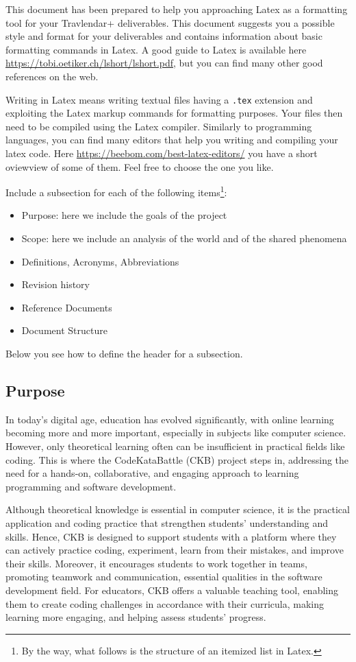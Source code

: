 This document has been prepared to help you approaching Latex as a formatting tool for your Travlendar+ deliverables. This document suggests you a possible style and format for your deliverables and contains information about basic formatting commands in Latex. A good guide to Latex is available here \href{https://tobi.oetiker.ch/lshort/lshort.pdf}{https://tobi.oetiker.ch/lshort/lshort.pdf}, but you can find many other good references on the web. 

Writing in Latex means writing textual files having a \texttt{.tex} extension and exploiting the Latex markup commands for formatting purposes. Your files then need to be compiled using the Latex compiler. Similarly to programming languages, you can find many editors that help you writing and compiling your latex code. Here \href{https://beebom.com/best-latex-editors/}{https://beebom.com/best-latex-editors/} you have a short oviewview of some of them. Feel free to choose the one you like.  

Include a subsection for each of the following items\footnote{By the way, what follows is the structure of an itemized list in Latex.}:
\begin{itemize}
\item
Purpose: here we include the goals of the project
\item
Scope: here we include an analysis of the world and of the shared phenomena
\item
Definitions, Acronyms, Abbreviations
\item
Revision history
\item
Reference Documents 
\item
Document Structure
\end{itemize}
Below you see how to define the header for a subsection.
\subsection{Purpose}
In today's digital age, education has evolved significantly, with online learning becoming more and more important, especially in subjects like computer science. However, only theoretical learning often can be insufficient in practical fields like coding. This is where the CodeKataBattle (CKB) project steps in, addressing the need for a hands-on, collaborative, and engaging approach to learning programming and software development.


Although theoretical knowledge is essential in computer science, it is the practical application and coding practice that strengthen students' understanding and skills. Hence, CKB is designed to support students with a platform where they can actively practice coding, experiment, learn from their mistakes, and improve their skills. Moreover, it encourages students to work together in teams, promoting teamwork and communication, essential qualities in the software development field. For educators, CKB offers a valuable teaching tool, enabling them to create coding challenges in accordance with their curricula, making learning more engaging, and helping assess students' progress.



